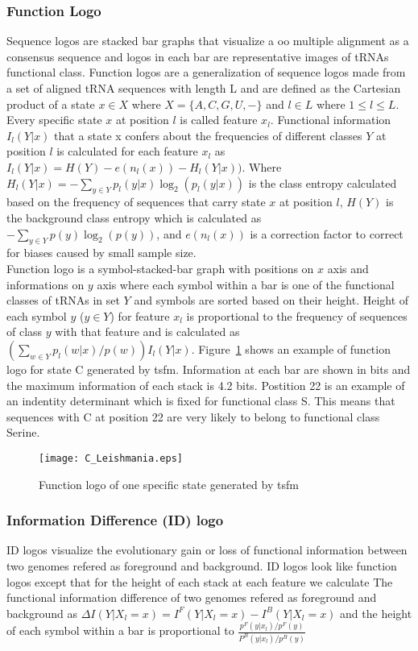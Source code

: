 \documentclass[
12pt, %
a4paper, %
oneside, %
headinclude,footinclude, %
BCOR5mm, %
]{scrartcl}
\begin{document}
\subsubsection*{\textbf{Function Logo}}
Sequence logos are stacked bar graphs that visualize a oo multiple alignment as a consensus sequence and logos in each bar are representative images of tRNAs functional class. Function logos \cite{Freyhult2006VisualizingBT} are a generalization of sequence logos \cite{Schneider} made from a set of aligned tRNA sequences with length L and are defined as the Cartesian product of a state $x \in X$ where $X = \{A, C, G, U, - \}$ and $l \in L$ where $1 \leqslant l \leqslant L$. Every specific state $x$ at position $l$ is called feature $x_l$. Functional information $I_l(Y|x)$ that a state x confers about the frequencies of different classes $Y$ at position $l$ is calculated for each feature $x_l$ as  $I_l(Y|x)=H(Y)-e(n_l(x))-H_l(Y|x))$. Where $H_l(Y|x)=-\sum_{y \in Y} p_l(y|x)\log_2(p_l(y|x))$ is the class entropy calculated based on the frequency of sequences that carry state $x$ at position $l$, $H(Y)$ is the background class entropy which is calculated as $-\sum_{y \in Y} p(y)\log_2(p(y))$, and $e(n_l(x))$ is a correction factor to correct for biases caused by small sample size. \\
Function logo is a symbol-stacked-bar graph with positions on $x$ axis and informations on $y$ axis where each symbol within a bar is one of the functional classes of tRNAs in set $Y$ and symbols are sorted based on their height. Height of each symbol $y$ ($y \in Y$) for feature $x_l$ is proportional to the frequency of sequences of class $y$ with that feature and is calculated as $(\sum_{w \in Y} p_l(w|x)/p(w)) I_l(Y|x)$. Figure~\ref{fig:Flogo} shows an example of function logo for state C generated by tsfm. Information at each bar are shown in bits and the maximum information of each stack is 4.2 bits. Postition 22 is an example of an indentity determinant which is fixed for functional class S. This means that sequences with C at position 22 are very likely to belong to functional class Serine. 

\begin{figure}[H]
\centering 
\texttt{[image: C\_Leishmania.eps]} 
\caption[]{Function logo of one specific state generated by tsfm}
\label{fig:Flogo} 
\end{figure}


\subsubsection*{\textbf{Information Difference (ID) logo}}
ID logos \cite{FREYHULT20071276} visualize the evolutionary gain or loss of functional information between two genomes refered as foreground and background. ID logos look like function logos except that for the height of each stack at each feature we calculate The functional information difference of two genomes refered as foreground and background as $\Delta I(Y|X_l=x)=I^F(Y|X_l=x)-I^B(Y|X_l=x)$ and the height of each symbol within a bar is proportional to $\frac{p^F(y|x_l)/p^F(y)}{P^B(y|x_l)/p^B(y)}$
\end{document}
